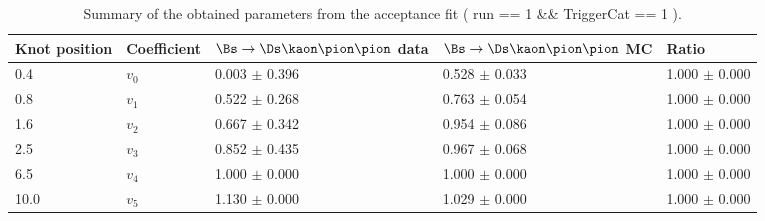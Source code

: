 \begin{table}[h]
\centering
\caption{Summary of the obtained parameters from the acceptance fit ( run == 1 && TriggerCat == 1 ).} 
\begin{tabular}{l l l l l}
\hline
\hline
Knot position & Coefficient & $\Bs\to\Ds\kaon\pion\pion$ data & $\Bs\to\Ds\kaon\pion\pion$ MC & Ratio \\
\hline
0.4 & $v_{0}$ & 0.003 $\pm$ 0.396 & 0.528 $\pm$ 0.033 & 1.000 $\pm$ 0.000\\
0.8 & $v_{1}$ & 0.522 $\pm$ 0.268 & 0.763 $\pm$ 0.054 & 1.000 $\pm$ 0.000\\
1.6 & $v_{2}$ & 0.667 $\pm$ 0.342 & 0.954 $\pm$ 0.086 & 1.000 $\pm$ 0.000\\
2.5 & $v_{3}$ & 0.852 $\pm$ 0.435 & 0.967 $\pm$ 0.068 & 1.000 $\pm$ 0.000\\
6.5 & $v_{4}$ & 1.000 $\pm$ 0.000 & 1.000 $\pm$ 0.000 & 1.000 $\pm$ 0.000\\
10.0 & $v_{5}$ & 1.130 $\pm$ 0.000 & 1.029 $\pm$ 0.000 & 1.000 $\pm$ 0.000\\
\hline
\hline
\end{tabular}
\label{table:splines}
\end{table}
